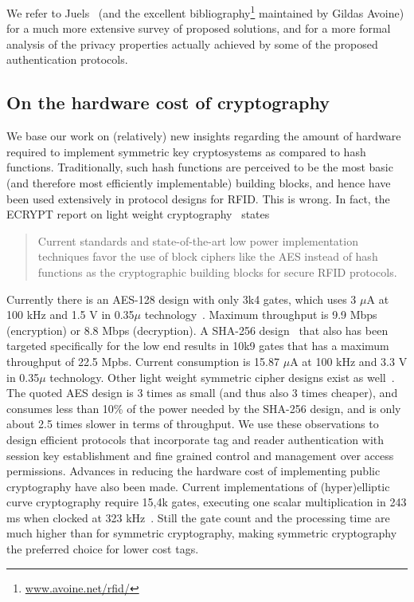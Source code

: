 We refer to Juels~\cite{juels2006rfid-secpriv-survey} 
(and the excellent bibliography\footnote{\url{www.avoine.net/rfid/}}
maintained by Gildas Avoine)
for a much more extensive survey of proposed solutions,
and \cite{juels2007strong-privacy-rfid} for a more formal analysis of the
privacy properties actually achieved by some of the proposed
authentication protocols.

\subsection{On the hardware cost of cryptography}

We base our work on (relatively) new insights regarding the amount of hardware
required to implement symmetric key cryptosystems as compared to hash
functions. Traditionally, such hash functions are perceived to be the most
basic (and therefore most efficiently implementable) building blocks, and hence
have been used extensively in protocol designs for RFID. 
This is wrong.
In fact, the ECRYPT report on light weight
cryptography~\cite{oswald2006light-weight-crypto}
states
\begin{quote}
Current standards and state-of-the-art low power implementation techniques
favor the use of block ciphers like the AES instead of hash functions as the
cryptographic building blocks for secure RFID
protocols.
\end{quote}
Currently there is an AES-128 design with only 3k4 gates, 
which uses 3 $\mu$A at 100 kHz and 1.5 V in 0.35$\mu$ technology~\cite{feldhofer2005aes-grain-sand,poschmann2007rfid-crypto,feldhofer2007strong-crypto-rfid}. 
Maximum throughput is 9.9 Mbps (encryption) or 8.8 Mbps (decryption). 
A SHA-256 design~\cite{DBLP:conf/otm/FeldhoferR06,feldhofer2007strong-crypto-rfid}
that also has been targeted specifically for the low end 
results in 10k9 gates that has a maximum throughput of 22.5 Mpbs. 
Current consumption is 15.87 $\mu$A at 100 kHz and 3.3 V in
0.35$\mu$ technology. Other light weight symmetric cipher designs exist as
well~\cite{bogdanov-present}. 
The quoted AES design is 3 times as small (and thus also 3 times cheaper), 
and consumes less than 10\% of the power needed by the SHA-256 design, 
and is only about 2.5 times slower in terms of throughput.
We use these observations to design efficient protocols that incorporate
tag and reader authentication with session key establishment and 
fine grained control and management over access permissions.
Advances in reducing the hardware cost of implementing public cryptography have
also been made. Current implementations of (hyper)elliptic curve cryptography 
require 15,4k gates, executing one scalar multiplication in 243 ms when clocked
at 323 kHz~\cite{Fan2009HECC,DBLP:journals/tc/LeeSBV08}. Still the gate count
and the processing time are much higher than for symmetric cryptography, making
symmetric cryptography the preferred choice for lower cost tags.

